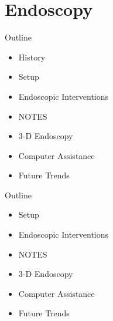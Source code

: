 


\subtitle{Endoscopy}




\frame[plain,c]{\titlepage} %

%

\section{Endoscopy} %




\begin{frame}{Outline}
	\begin{itemize}
		\item History
		\item Setup
		\item Endoscopic Interventions
		\item NOTES
		\item 3-D Endoscopy
		\item Computer Assistance
		\item Future Trends
	\end{itemize}
\end{frame}



\begin{frame}{Outline}
	\begin{itemize}
		\bolditem{} History
		\item Setup
		\item Endoscopic Interventions
		\item NOTES
		\item 3-D Endoscopy
		\item Computer Assistance
		\item Future Trends
	\end{itemize}
\end{frame}



